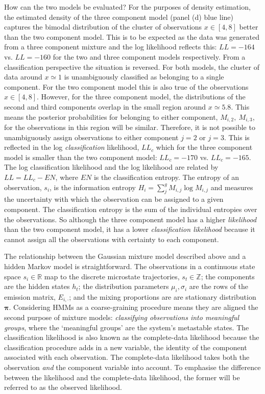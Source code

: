 How can the two models be evaluated?  For the purposes of density estimation, the estimated density of the three component model (panel (d) blue line) captures the bimodal distribution of the cluster of observations $x \in [4, 8]$ better than the two component model. This is to be expected as the data was generated from a three component mixture and the log likelihood reflects this: $LL=\num{-164}$ vs. $LL=\num{-160}$ for the two and three component models respectively. From a classification perspective the situation is reversed. For both models, the cluster of data around $x\simeq 1$ is unambiguously classified as belonging to a single component. For the two component model this is also true of the observations $x  \in [4, 8]$. However, for the three component model, the  distributions of the second and third components overlap in the small region around $x\simeq 5.8$. This means the posterior probabilities for belonging to either component, $M_{i, 2},\ M_{i, 3}$,  for the observations in this region will be similar. Therefore, it is not possible to unambiguously assign observations to either component $j=2$ or $j=3$. This is reflected in the log \emph{classification} likelihood, $LL_{c}$ which for the three component model is smaller than the two component model: $LL_{c}=\num{-170}$ vs. $LL_{c} = \num{-165}$. The log classification likelihood and the log likelihood are related by $LL = LL_{c} - EN$, where $EN$ is the classification entropy.\cite{hathaway1986another}  The entropy of an observation, $s_i$, is the information entropy  $H_i = \sum_{j}^{g}M_{i,j}\log{M_{i,j}}$  and measures the uncertainty with which the observation can be assigned to a given component.\cite{mackay2003information} The classification entropy is the sum of the individual entropies over the observations.\cite{mclachlanFiniteMixtureModels2000} So although the three component model has a higher \emph{likelihood} than the two component model, it has a lower \emph{classification likelihood} because it cannot assign all the observations with certainty to each component. 

The relationship between the Gaussian mixture model described above and a hidden Markov model is straightforward. The observations in a continuous state space $s_{i} \in \mathbb{R}$ map to the discrete microstate trajectories, $s_{t} \in \mathbb{Z}$; the components are the hidden states $h_{t}$; the distribution parameters $\mu_{i}, \sigma_{i}$ are the rows of the emission matrix, $E_{i, \cdot}$; and the mixing proportions are are stationary distribution $\bm{\pi}$. Considering HMMs as a coarse-graining procedure means they are aligned the second purpose of mixture models: \emph{classifying observations into meaningful groups}, where the `meaningful groups' are the system's metastable states. The classification likelihood is also known as the complete-data likelihood because the classification procedure adds in a new variable, the identity of the component associated with each observation. The complete-data likelihood takes both the observation \emph{and} the component variable into account.\cite{mclachlan1988mixture} To emphasise the difference between the likelihood and the complete-data likelihood, the former will be referred to as the observed likelihood.  

